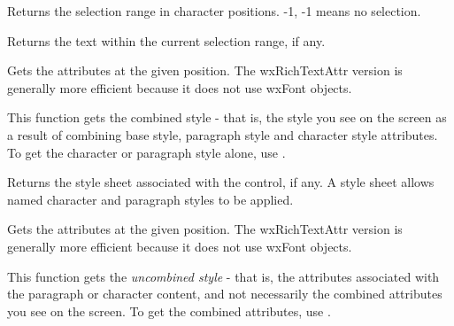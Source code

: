 Returns the selection range in character positions. -1, -1 means no selection.

\label{wxrichtextctrlgetstringselection}


Returns the text within the current selection range, if any.

\label{wxrichtextctrlgetstyle}




Gets the attributes at the given position. The wxRichTextAttr version is generally more efficient
because it does not use wxFont objects.

This function gets the combined style - that is, the style you see on the screen as a result
of combining base style, paragraph style and character style attributes. To get the character
or paragraph style alone, use .

\label{wxrichtextctrlgetstylesheet}


Returns the style sheet associated with the control, if any. A style sheet allows named
character and paragraph styles to be applied.

\label{wxrichtextctrlgetuncombinedstyle}




Gets the attributes at the given position. The wxRichTextAttr version is generally more efficient
because it does not use wxFont objects.

This function gets the {\it uncombined style} - that is, the attributes associated with the
paragraph or character content, and not necessarily the combined attributes you see on the
screen. To get the combined attributes, use .

